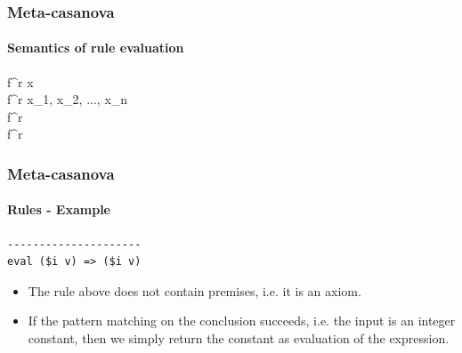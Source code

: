 \documentclass[mathserif,serif]{beamer}
\begin{document}
\begin{frame}
	\frametitle{Meta-casanova}
	\framesubtitle{Semantics of rule evaluation}
	
	\begin{mathpar}
		{\langle f^{r} \rangle \Rightarrow x} \\
		
		{\langle f^{r} \rangle \Rightarrow \lbrace x_{1}, x_{2}, ..., x_{n} \rbrace} \\
		
		{\langle f^{r} \rangle \Rightarrow \emptyset} \\
		
		{\langle f^{r} \rangle \Rightarrow \emptyset}
	\end{mathpar}
\end{frame}

\begin{frame}[fragile]
	\frametitle{Meta-casanova}
	\framesubtitle{Rules - Example}
	
	\begin{lstlisting}
---------------------
eval ($i v) => ($i v)
	\end{lstlisting}
	
	\begin{itemize}
		\item The rule above does not contain premises, i.e. it is an axiom.
		\item If the pattern matching on the conclusion succeeds, i.e. the input is an integer constant, then we simply return the constant as evaluation of the expression.
	\end{itemize}

\end{frame}
\end{document}
